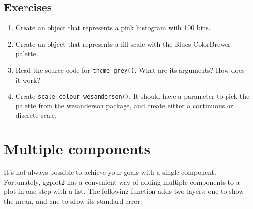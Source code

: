 \subsection{Exercises}

\begin{enumerate}
\def\labelenumi{\arabic{enumi}.}
\item
  Create an object that represents a pink histogram with 100 bins.
\item
  Create an object that represents a fill scale with the Blues
  ColorBrewer palette.
\item
  Read the source code for \texttt{theme\_grey()}. What are its
  arguments? How does it work?
\item
  Create \texttt{scale\_colour\_wesanderson()}. It should have a
  parameter to pick the palette from the wesanderson package, and create
  either a continuous or discrete scale.
\end{enumerate}

\section{Multiple components}

It's not always possible to achieve your goals with a single component.
Fortunately, ggplot2 has a convenient way of adding multiple components
to a plot in one step with a list. The following function adds two
layers: one to show the mean, and one to show its standard error:

\begin{Shaded}
\begin{Highlighting}[]
\StringTok{ }
  \NormalTok{(}
    \NormalTok{(} \NormalTok{, } \NormalTok{, } \NormalTok{),}
    \NormalTok{(} \NormalTok{, } \NormalTok{, } \NormalTok{)}
  \NormalTok{)}
\NormalTok{\}}
\StringTok{ }\NormalTok{()}
\StringTok{ }\NormalTok{()}
\end{Highlighting}
\end{Shaded}

